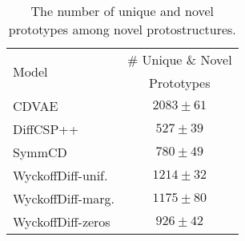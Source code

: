 \begin{table}[tb!]
\caption{The number of unique and novel prototypes among  novel protostructures.}
\label{tab:prototype-uniqueness}
\vskip 0.15in
\begin{center}
\begin{small}
\begin{sc}
\begin{tabular}{lc}
\toprule
\multirow{2}{*}{Model}  & \# Unique \& Novel  \\
                        & Prototypes         \\
\midrule \midrule
CDVAE                   & $2083\pm61$        \\
DiffCSP++               & $527\pm39$        \\
SymmCD                  & $780\pm49$         \\
\midrule
WyckoffDiff-unif.       & $1214\pm32$        \\
WyckoffDiff-marg.       & $1175\pm80$        \\
WyckoffDiff-zeros       & $926\pm42$         \\
\bottomrule
\end{tabular}
\end{sc}
\end{small}
\end{center}
\vskip -0.1in
\end{table}
